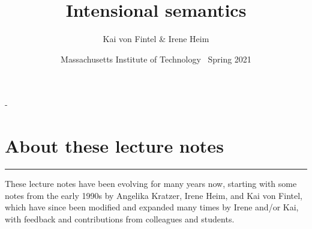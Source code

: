 \frontmatter

\title{Intensional semantics}
\author{Kai von Fintel \& Irene Heim}
\date{Massachusetts Institute of Technology \textbullet\ Spring 2021}

\pagestyle{empty}

\begin{titlingpage}
  \calccentering\unitlength %
  \begin{adjustwidth}{\unitlength}{-\unitlength}
    \par
    \vfill
    \begin{center}
      {\HUGE \thetitle}\par
      \vspace{4\baselineskip}
      {\LARGE\MakeUppercase{\theauthor}}\par
    \end{center}
  \end{adjustwidth} 
\end{titlingpage}
\cleardoublepage

\pagestyle{empty}
\titleVDQI

\clearpage
\vspace*{\fill}
\section*{About these lecture notes}

\plainbreak{1} 

These lecture notes have been evolving for many years now, starting with some
notes from the early 1990s by Angelika Kratzer, Irene Heim, and Kai von Fintel,
which have since been modified and expanded many times by Irene and/or Kai, with
feedback and contributions from colleagues and students.

